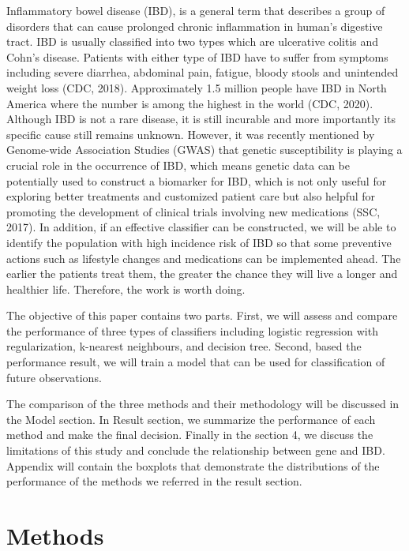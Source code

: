 \documentclass[preprint, 3p,
authoryear]{elsarticle} %
\begin{document}
Inflammatory bowel disease (IBD), is a general term that describes a
group of disorders that can cause prolonged chronic inflammation in
human's digestive tract. IBD is usually classified into two types which
are ulcerative colitis and Cohn's disease. Patients with either type of
IBD have to suffer from symptoms including severe diarrhea, abdominal
pain, fatigue, bloody stools and unintended weight loss \citep{CDC}
(CDC, 2018). Approximately 1.5 million people have IBD in North America
where the number is among the highest in the world \citep{CDC} (CDC,
2020). Although IBD is not a rare disease, it is still incurable and
more importantly its specific cause still remains unknown. However, it
was recently mentioned by Genome-wide Association Studies (GWAS) that
genetic susceptibility is playing a crucial role in the occurrence of
IBD, which means genetic data can be potentially used to construct a
biomarker for IBD, which is not only useful for exploring better
treatments and customized patient care but also helpful for promoting
the development of clinical trials involving new medications (SSC,
2017). In addition, if an effective classifier can be constructed, we
will be able to identify the population with high incidence risk of IBD
so that some preventive actions such as lifestyle changes and
medications can be implemented ahead. The earlier the patients treat
them, the greater the chance they will live a longer and healthier life.
Therefore, the work is worth doing.

The objective of this paper contains two parts. First, we will assess
and compare the performance of three types of classifiers including
logistic regression with regularization, k-nearest neighbours, and
decision tree. Second, based the performance result, we will train a
model that can be used for classification of future observations.

The comparison of the three methods and their methodology will be 
discussed in the Model section. In Result section, we summarize the 
performance of each method and make the final decision. Finally in
the section 4, we discuss the limitations of this study and conclude 
the relationship between gene and IBD. Appendix will contain the boxplots 
that demonstrate the distributions of the performance of the methods 
we referred in the result section.

\hypertarget{methods}{%
\section{Methods}\label{methods}}
\end{document}
